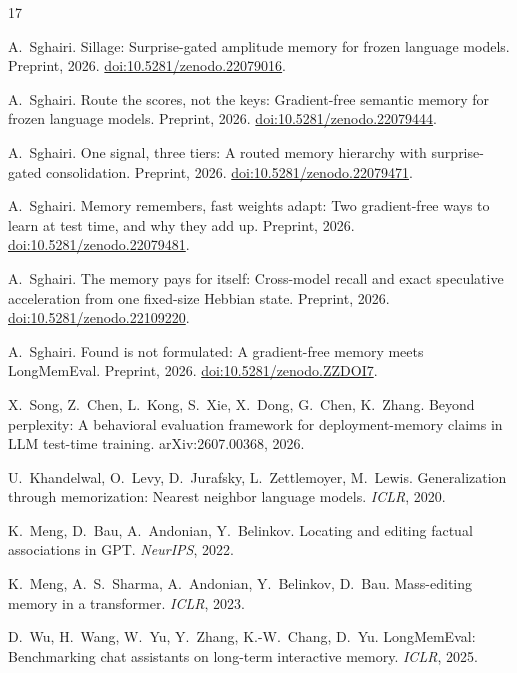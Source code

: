 \documentclass[11pt]{article}
\begin{document}
\begin{thebibliography}{17}\small

 A.~Sghairi. Sillage: Surprise-gated amplitude memory for frozen language models. Preprint, 2026. \href{https://doi.org/10.5281/zenodo.22079016}{doi:10.5281/zenodo.22079016}.

 A.~Sghairi. Route the scores, not the keys: Gradient-free semantic memory for frozen language models. Preprint, 2026. \href{https://doi.org/10.5281/zenodo.22079444}{doi:10.5281/zenodo.22079444}.

 A.~Sghairi. One signal, three tiers: A routed memory hierarchy with surprise-gated consolidation. Preprint, 2026. \href{https://doi.org/10.5281/zenodo.22079471}{doi:10.5281/zenodo.22079471}.

 A.~Sghairi. Memory remembers, fast weights adapt: Two gradient-free ways to learn at test time, and why they add up. Preprint, 2026. \href{https://doi.org/10.5281/zenodo.22079481}{doi:10.5281/zenodo.22079481}.

 A.~Sghairi. The memory pays for itself: Cross-model recall and exact speculative acceleration from one fixed-size Hebbian state. Preprint, 2026. \href{https://doi.org/10.5281/zenodo.22109220}{doi:10.5281/zenodo.22109220}.

 A.~Sghairi. Found is not formulated: A gradient-free memory meets LongMemEval. Preprint, 2026. \href{https://doi.org/10.5281/zenodo.ZZDOI7}{doi:10.5281/zenodo.ZZDOI7}.

 X.~Song, Z.~Chen, L.~Kong, S.~Xie, X.~Dong, G.~Chen, K.~Zhang. Beyond perplexity: A behavioral evaluation framework for deployment-memory claims in LLM test-time training. arXiv:2607.00368, 2026.

 U.~Khandelwal, O.~Levy, D.~Jurafsky, L.~Zettlemoyer, M.~Lewis. Generalization through memorization: Nearest neighbor language models. \emph{ICLR}, 2020.

 K.~Meng, D.~Bau, A.~Andonian, Y.~Belinkov. Locating and editing factual associations in GPT. \emph{NeurIPS}, 2022.

 K.~Meng, A.~S.~Sharma, A.~Andonian, Y.~Belinkov, D.~Bau. Mass-editing memory in a transformer. \emph{ICLR}, 2023.

 D.~Wu, H.~Wang, W.~Yu, Y.~Zhang, K.-W.~Chang, D.~Yu. LongMemEval: Benchmarking chat assistants on long-term interactive memory. \emph{ICLR}, 2025.


\end{thebibliography}
\end{document}
